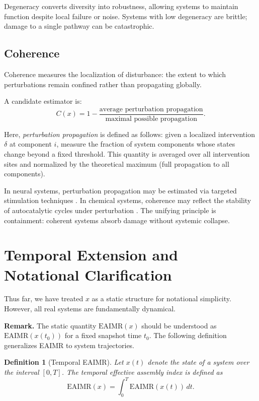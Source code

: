 \documentclass[11pt,letterpaper]{article}
\newtheorem{definition}{Definition}
\begin{document}
Degeneracy converts diversity into robustness, allowing systems to maintain function despite local failure or noise. Systems with low degeneracy are brittle; damage to a single pathway can be catastrophic.

\subsection{Coherence}

Coherence measures the localization of disturbance: the extent to which perturbations remain confined rather than propagating globally.

A candidate estimator is:
\[
C(x) = 1 - \frac{\text{average perturbation propagation}}{\text{maximal possible propagation}}.
\]

Here, \emph{perturbation propagation} is defined as follows: given a localized intervention $\delta$ at component $i$, measure the fraction of system components whose states change beyond a fixed threshold. This quantity is averaged over all intervention sites and normalized by the theoretical maximum (full propagation to all components).

In neural systems, perturbation propagation may be estimated via targeted stimulation techniques \parencite{massimini2005}. In chemical systems, coherence may reflect the stability of autocatalytic cycles under perturbation \parencite{kauffman1993}. The unifying principle is containment: coherent systems absorb damage without systemic collapse.

\section{Temporal Extension and Notational Clarification}

Thus far, we have treated $x$ as a static structure for notational simplicity. However, all real systems are fundamentally dynamical.

\textbf{Remark.} The static quantity $\mathrm{EAIMR}(x)$ should be understood as $\mathrm{EAIMR}(x(t_0))$ for a fixed snapshot time $t_0$. The following definition generalizes EAIMR to system trajectories.

\begin{definition}[Temporal EAIMR]
Let $x(t)$ denote the state of a system over the interval $[0,T]$. The temporal effective assembly index is defined as
\[
\mathrm{EAIMR}(x) = \int_0^T \mathrm{EAIMR}(x(t)) \, dt.
\]
\end{definition}
\end{document}
